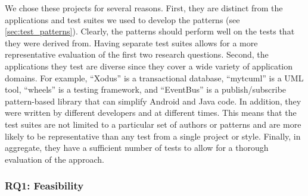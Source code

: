 \documentclass[proposal.tex]{subfiles}
\begin{document}
We chose these projects for several reasons.
%
First, they are distinct from the applications and test suites we used to develop the patterns (see \cref{sec:test_patterns}).
%
Clearly, the patterns should perform well on the tests that they were derived from.
%
Having separate test suites allows for a more representative evaluation of the first two research questions.
%
Second, the applications they test are diverse since they cover a wide variety of application domains.
%
For example, \enquote{Xodus} is a transactional database, \enquote{mytcuml} is a UML tool, \enquote{wheels} is a testing framework, and \enquote{EventBus} is a publish\slash subscribe pattern-based library that can simplify Android and Java code.
%
In addition, they were written by different developers and at different times.
%
This means that the test suites are not limited to a particular set of authors or patterns and are more likely to be representative than any test from a single project or style.
%
Finally, in aggregate, they have a sufficient number of tests to allow for a thorough evaluation of the approach.


\subsubsection{RQ1: Feasibility}
\label{sec:evaluation:feasibility}
\end{document}
